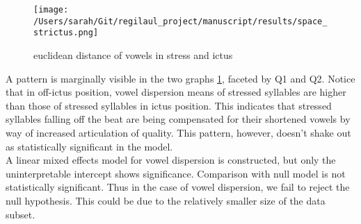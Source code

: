 \begin{figure}[htb]
\centering
\texttt{[image: /Users/sarah/Git/regilaul\_project/manuscript/results/space\_strictus.png]}
\caption{euclidean distance of vowels in stress and ictus}
\label{spcstrick}

\end{figure}
A pattern is marginally visible in the two graphs  \ref{spcstrick}, faceted by Q1 and Q2. Notice that in off-ictus position, vowel dispersion means of stressed syllables are higher than those of stressed syllables in ictus position. This indicates that stressed syllables falling off the beat are being compensated for their shortened vowels by way of increased articulation of quality. This pattern, however, doesn't shake out as statistically significant in the model. \\
A linear mixed effects model for vowel dispersion is constructed, but only the uninterpretable intercept shows significance. 
Comparison with null model is not statistically significant. Thus in the case of vowel dispersion, we fail to reject the null hypothesis. This could be due to the relatively smaller size of the data subset. 


